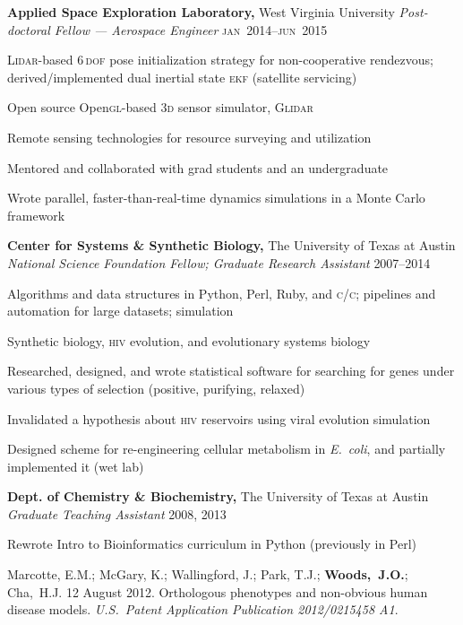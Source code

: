 \documentclass[12pt,letterpaper]{article}
\newenvironment{itemize*}%
{\begin{itemize}%
  \setlength{\itemsep}{0pt}}%
{\end{itemize}}
\newcommand{\Cpp}{\textsc{c}\nolinebreak[4]\hspace{-.05em}\raisebox{.4ex}{\relsize{-3}{\textbf{++}}}}
\newcommand{\mhead}[1]{\leavevmode\marginpar{\sffamily\footnotesize #1}}
\newcommand{\rdate}[1]{{\hfill #1}}
\begin{document}
\bigskip
\mhead{Academic \newline Appointments}%
\textbf{Applied Space Exploration Laboratory,} West Virginia University \newline
\emph{Post-doctoral Fellow --- Aerospace Engineer} \rdate{\textsc{jan}~2014--\textsc{jun}~2015}
\begin{itemize*}
  \item \textsc{Lidar}-based \textsc{6\,dof} pose initialization strategy for non-cooperative rendezvous; derived/implemented dual inertial state \textsc{ekf} (satellite servicing)%
  \item Open source Open\textsc{gl}-based \textsc{3d} sensor simulator, \textsc{Glidar}
  \item Remote sensing technologies for resource surveying and utilization
  \item Mentored and collaborated with grad students and an undergraduate
  \item Wrote parallel, faster-than-real-time dynamics simulations in a Monte Carlo framework
\end{itemize*}

\medskip
\textbf{Center for Systems \& Synthetic Biology,} The University of Texas at Austin\newline
\emph{National Science Foundation Fellow; Graduate Research Assistant}  \rdate{2007--2014}
\begin{itemize*}
  \item Algorithms and data structures in Python, Perl, Ruby, and \textsc{c}/\Cpp; pipelines and automation for large datasets; simulation
  \item Synthetic biology, \textsc{hiv} evolution, and evolutionary systems biology 
  \item Researched, designed, and wrote statistical software for searching for genes under various types of selection (positive, purifying, relaxed)
  \item Invalidated a hypothesis about \textsc{hiv} reservoirs using viral evolution simulation
  \item Designed scheme for re-engineering cellular metabolism in \textit{E.~coli}, and partially implemented it (wet lab)
\end{itemize*}

\medskip
\textbf{Dept. of Chemistry \& Biochemistry,} The University of Texas at Austin\newline
\emph{Graduate Teaching Assistant} \rdate{2008, 2013}
\begin{itemize*}
  \item Rewrote Intro to Bioinformatics curriculum in Python (previously in Perl)
\end{itemize*}
\bigskip
\mhead{Patents}%
\par\vspace{-\baselineskip}Marcotte, E.M.; McGary, K.; Wallingford, J.; Park, T.J.; \textbf{Woods,~J.O.}; Cha,~H.J. 12 August 2012. Orthologous phenotypes and non-obvious human disease models. \textit{U.S.\ Patent Application Publication 2012/0215458 A1}.
\end{document}
